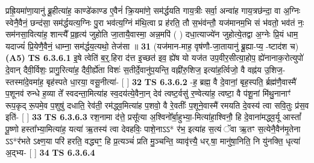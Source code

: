 \documentclass[17pt]{extarticle}
\begin{document}
                  प्रह्रि॒यमा॑णा॒यानु॑ ब्रू॒हीत्या॑ह॒ काण्डे॑काण्ड ए॒वैनं॑ क्रि॒यमा॑णे॒ सम॑र्द्धयति गाय॒त्रीः सर्वा॒ अन्वा॑ह गाय॒त्रछ॑न्दा॒ वा अ॒ग्निः स्वेनै॒वैनं॒ छन्द॑सा॒ सम॑र्द्धयत्य॒ग्निः पु॒रा भव॑त्य॒ग्निं म॑थि॒त्वा प्र ह॑रति॒ तौ स॒भंव॑न्तौ॒ यज॑मानम॒भि सं भ॑वतो॒ भव॑तं नः॒ सम॑नसा॒वित्या॑ह॒ शान्त्यै᳚ प्र॒हृत्य॑ जुहोति जा॒तायै॒वास्मा॒ अन्न॒मपि॑ ( ) दधा॒त्याज्ये॑न जुहोत्ये॒तद्वा अ॒ग्नेः प्रि॒यं धाम॒ यदाज्यं॑ प्रि॒येणै॒वैनं॒ धाम्ना॒ सम॑र्द्धय॒त्यथो॒ तेज॑सा ॥ \textbf{  31} \newline
                  \newline
                      (यज॑मान-माह॒ वृष॑णौ-जा॒तायानु॑ ब्रू॒ह्या-प्य॒ -ष्टाद॑श च)  \textbf{(A5)} \newline \newline
                                        \textbf{ TS 6.3.6.1} \newline
                  इ॒षे त्वेति॑ ब॒र्॒.हिरा द॑त्त इ॒च्छत॑ इव॒ ह्ये॑ष यो यज॑त उप॒वीर॒सीत्या॒होप॒ ह्ये॑नानाक॒रोत्युपो॑ दे॒वान् दैवी॒र्विशः॒ प्रागु॒रित्या॑ह॒ दैवी॒र्ह्ये॑ता विशः॑ स॒तीर्दे॒वानु॑प॒यन्ति॒ वह्नी॑रु॒शिज॒ इत्या॑ह॒र्त्विजो॒ वै वह्न॑य उ॒शिज॒-स्तस्मा॑दे॒वमा॑ह॒ बृह॑स्पते धा॒रया॒ वसू॒नीत्या॑- [  ] \textbf{  32} \newline
                  \newline
                                \textbf{ TS 6.3.6.2} \newline
                  -ह॒ ब्रह्म॒ वै दे॒वानां॒ बृह॒स्पति॒ र्ब्रह्म॑णै॒वास्मै॑ प॒शूनव॑ रुन्धे ह॒व्या ते᳚ स्वदन्ता॒मित्या॑ह स्व॒दय॑त्ये॒वैना॒न् देव॑ त्वष्ट॒र्वसु॑ र॒ण्वेत्या॑ह॒ त्वष्टा॒ वै प॑शू॒नां मि॑थु॒नानाꣳ॑ रूप॒कृद् रू॒पमे॒व प॒शुषु॑ दधाति॒ रेव॑ती॒ रम॑द्ध्व॒मित्या॑ह प॒शवो॒ वै रे॒वतीः᳚ प॒शूने॒वास्मै॑ रमयति दे॒वस्य॑ त्वा सवि॒तुः प्र॑स॒व इति॑- [  ] \textbf{  33} \newline
                  \newline
                                \textbf{ TS 6.3.6.3} \newline
                  रश॒नामा द॑त्ते॒ प्रसू᳚त्या अ॒श्विनो᳚र्बा॒हुभ्या॒-मित्या॑हा॒श्विनौ॒ हि दे॒वाना॑मद्ध्व॒र्यू आस्तां᳚ पू॒ष्णो हस्ता᳚भ्या॒मित्या॑ह॒ यत्या॑ ऋ॒तस्य॑ त्वा देवहविः॒ पाशे॒नाऽऽ* र॑भ॒ इत्या॑ह स॒त्यं ॅवा ऋ॒तꣳ स॒त्येनै॒वैन॑मृ॒तेना ऽऽ*र॑भते ऽक्ष्ण॒या परि॑ हरति॒ वद्ध्यꣳ॒॒ हि प्र॒त्यञ्चं॑ प्रति मु॒ञ्चन्ति॒ व्यावृ॑त्त्यै॒ धर्.षा॒ मानु॑षा॒निति॒ नि यु॑नक्ति॒ धृत्या॑ अ॒द्भ्य- [  ] \textbf{  34} \newline
                  \newline
                                \textbf{ TS 6.3.6.4} \newline
\end{document}
